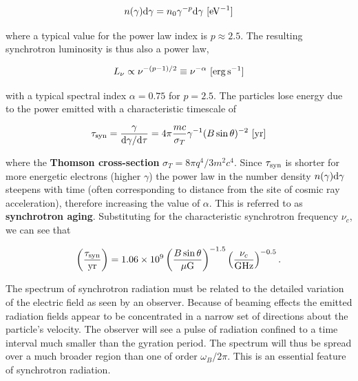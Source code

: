 \documentclass[a4paper,10pt]{article}
\begin{document}
\begin{align*}
    n(\gamma){\rm d}\gamma = n_0\gamma^{-p}{\rm d}\gamma ~ [{\rm eV^{-1}}]
\end{align*}

{\noindent}where a typical value for the power law index is $p\approx2.5$. The resulting synchrotron luminosity is thus also a power law,

\begin{align*}
    L_\nu \propto \nu^{-(p-1)/2}\equiv \nu^{-\alpha} ~ [{\rm erg\,s^{-1}}]
\end{align*}

{\noindent}with a typical spectral index $\alpha=0.75$ for $p=2.5$. The particles lose energy due to the power emitted with a characteristic timescale of

\begin{align*}
    \tau_{\rm syn} = \frac{\gamma}{{\rm d}\gamma/{\rm d}\tau} = 4\pi\frac{mc}{\sigma_T}\gamma^{-1}(B\sin\theta)^{-2} ~ [{\rm yr}]
\end{align*}

{\noindent}where the \textbf{Thomson cross-section} $\sigma_T=8\pi q^4/3m^2c^4$. Since $\tau_{\rm syn}$ is shorter for more energetic electrons (higher $\gamma$) the power law in the number density $n(\gamma){\rm d}\gamma$ steepens with time (often corresponding to distance from the site of cosmic ray acceleration), therefore increasing the value of $\alpha$. This is referred to as \textbf{synchrotron aging}. Substituting for the characteristic synchrotron frequency $\nu_c$, we can see that

\begin{align*}
    \left(\frac{\tau_{\rm syn}}{{\rm yr}}\right) = 1.06\times10^9 \left(\frac{B\sin\theta}{\mu{\rm G}}\right)^{-1.5} \left(\frac{\nu_c}{{\rm GHz}}\right)^{-0.5}.
\end{align*}

{\noindent}The spectrum of synchrotron radiation must be related to the detailed variation of the electric field as seen by an observer. Because of beaming effects the emitted radiation fields appear to be concentrated in a narrow set of directions about the particle's velocity. The observer will see a pulse of radiation confined to a time interval much smaller than the gyration period. The spectrum will thus be spread over a much broader region than one of order $\omega_B/2\pi$. This is an essential feature of synchrotron radiation.
\end{document}
